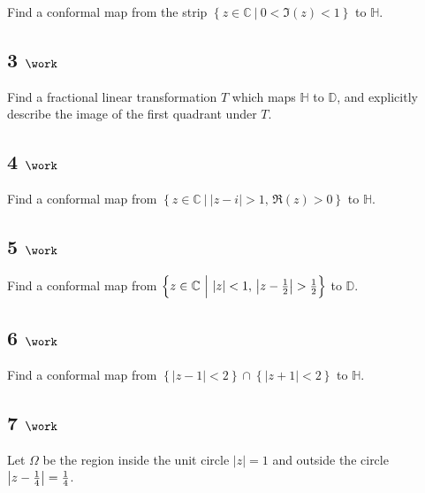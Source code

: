 Find a conformal map from the strip
\(\left\{{z\in {\mathbb{C}}{~\mathrel{\Big|}~}0 < \Im(z) < 1}\right\}\)
to \({\mathbb{H}}\).

\hypertarget{work-18}{%
\subsection{\texorpdfstring{3
\(\work\)}{3 \textbackslash work}}\label{work-18}}

Find a fractional linear transformation \(T\) which maps
\({\mathbb{H}}\) to \({\mathbb{D}}\), and explicitly describe the image
of the first quadrant under \(T\).

\hypertarget{work-19}{%
\subsection{\texorpdfstring{4
\(\work\)}{4 \textbackslash work}}\label{work-19}}

Find a conformal map from
\(\left\{{z\in {\mathbb{C}}{~\mathrel{\Big|}~}{\left\lvert {z-i} \right\rvert} > 1,\, \Re(z) > 0}\right\}\)
to \({\mathbb{H}}\).

\hypertarget{work-20}{%
\subsection{\texorpdfstring{5
\(\work\)}{5 \textbackslash work}}\label{work-20}}

Find a conformal map from
\(\left\{{z\in {\mathbb{C}}{~\mathrel{\Big|}~}{\left\lvert {z} \right\rvert} < 1,\, {\left\lvert {z - {1\over 2}} \right\rvert} > {1\over 2} }\right\}\)
to \({\mathbb{D}}\).

\hypertarget{work-21}{%
\subsection{\texorpdfstring{6
\(\work\)}{6 \textbackslash work}}\label{work-21}}

Find a conformal map from
\(\left\{{{\left\lvert {z-1} \right\rvert} < 2}\right\} \cap\left\{{{\left\lvert {z+1} \right\rvert} < 2}\right\}\)
to \({\mathbb{H}}\).

\hypertarget{work-22}{%
\subsection{\texorpdfstring{7
\(\work\)}{7 \textbackslash work}}\label{work-22}}

Let \(\Omega\) be the region inside the unit circle
\({\left\lvert {z} \right\rvert} = 1\) and outside the circle
\({\left\lvert {z-{1\over 4}} \right\rvert} = {1\over 4}\).

